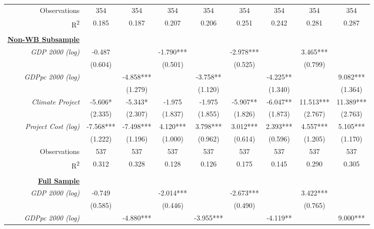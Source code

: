 \documentclass{article}
\begin{document}
\begin{singlespace}
\begin{table}[H]
{\begin{tabular}{rcccccccc}
			Observations & 354 & 354 & 354 & 354 & 354 & 354 & 354 & 354 \\
			R\textsuperscript{2} & 0.185 & 0.187 & 0.207 & 0.206 & 0.251 & 0.242 & 0.281 & 0.287 \\ \hline
			\multicolumn{1}{l}{\textit{}} & \multicolumn{1}{l}{} & \multicolumn{1}{l}{} & \multicolumn{1}{l}{} & \multicolumn{1}{l}{} & \multicolumn{1}{l}{} & \multicolumn{1}{l}{} & \multicolumn{1}{l}{} & \multicolumn{1}{l}{} \\
			{\ul \textbf{Non-WB Subsample}} &  &  &  &  &  &  &  &  \\
			\textit{GDP 2000 (log)} & -0.487 &  & -1.790*** &  & -2.978*** &  & 3.465*** &  \\
			\textit{} & (0.604) &  & (0.501) &  & (0.525) &  & (0.799) &  \\
			\textit{GDPpc 2000 (log)} &  & -4.858*** &  & -3.758** &  & -4.225** &  & 9.082*** \\
			\textit{} &  & (1.279) &  & (1.120) &  & (1.340) &  & (1.364) \\
			\textit{Climate Project} & -5.606* & -5.343* & -1.975 & -1.975 & -5.907** & -6.047** & 11.513*** & 11.389*** \\
			\textit{} & (2.335) & (2.307) & (1.837) & (1.855) & (1.826) & (1.873) & (2.767) & (2.763) \\
			\textit{Project Cost (log)} & -7.568*** & -7.498*** & 4.120*** & 3.798*** & 3.012*** & 2.393*** & 4.557*** & 5.105*** \\
			\textit{} & (1.222) & (1.196) & (1.000) & (0.962) & (0.614) & (0.596) & (1.205) & (1.170) \\ \hline
			Observations & 537 & 537 & 537 & 537 & 537 & 537 & 537 & 537 \\
			R\textsuperscript{2} & 0.312 & 0.328 & 0.128 & 0.126 & 0.175 & 0.145 & 0.290 & 0.305 \\ \hline
			\multicolumn{1}{l}{\textit{}} & \multicolumn{1}{l}{} & \multicolumn{1}{l}{} & \multicolumn{1}{l}{} & \multicolumn{1}{l}{} & \multicolumn{1}{l}{} & \multicolumn{1}{l}{} & \multicolumn{1}{l}{} & \multicolumn{1}{l}{} \\
			{\ul \textbf{Full Sample}} &  &  &  &  &  &  &  &  \\
			\textit{GDP 2000 (log)} & -0.749 &  & -2.014*** &  & -2.673*** &  & 3.422*** &  \\
			\textit{} & (0.585) &  & (0.446) &  & (0.490) &  & (0.765) &  \\
			\textit{GDPpc 2000 (log)} &  & -4.880*** &  & -3.955*** &  & -4.119** &  & 9.000*** \\

\end{tabular}}
\end{table}
\end{singlespace}
\end{document}
